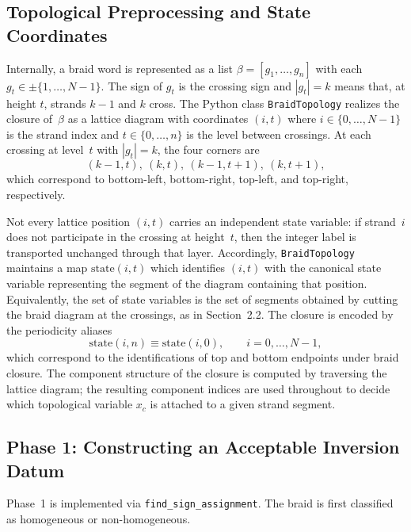 \documentclass[twocolumn]{article}
\begin{document}
\subsection{Topological Preprocessing and State Coordinates}

Internally, a braid word is represented as a list
\(\beta=[g_1,\dots,g_n]\) with each \(g_t\in\pm\{1,\dots,N-1\}\).
The sign of \(g_t\) is the crossing sign and \(|g_t|=k\) means that, at height
\(t\), strands \(k-1\) and \(k\) cross.
The Python class \texttt{BraidTopology} 
realizes the closure of~\(\beta\) as a lattice diagram with coordinates
\((i,t)\) where \(i\in\{0,\dots,N-1\}\) is the strand index and
\(t\in\{0,\dots,n\}\) is the level between crossings.
At each crossing at level~\(t\) with \(|g_t|=k\), the four corners are
\begin{equation}\label{eq:corner-coordinates}
  (k-1,t),\ (k,t),\ (k-1,t+1),\ (k,t+1),
\end{equation}
which correspond to bottom-left, bottom-right, top-left, and top-right,
respectively.

Not every lattice position \((i,t)\) carries an independent state variable:
if strand~\(i\) does not participate in the crossing at height~\(t\), then the
integer label is transported unchanged through that layer.
Accordingly, \texttt{BraidTopology} maintains a map
\(\mathrm{state}(i,t)\) which identifies \((i,t)\) with the canonical state
variable representing the segment of the diagram containing that position.
Equivalently, the set of state variables is the set of segments obtained by
cutting the braid diagram at the crossings, as in Section~2.2.
The closure is encoded by the periodicity aliases
\begin{equation}\label{eq:periodicity}
  \mathrm{state}(i,n)\equiv \mathrm{state}(i,0),\qquad i=0,\dots,N-1,
\end{equation}
which correspond to the identifications of top and bottom endpoints under braid
closure.
The component structure of the closure is computed by traversing the lattice
diagram; the resulting component indices are used throughout to decide which
topological variable \(x_c\) is attached to a given strand segment.

\subsection{Phase 1: Constructing an Acceptable Inversion Datum}

Phase~1 is implemented via
\texttt{find\_sign\_assignment}.
The braid is first classified as homogeneous or non-homogeneous.
\end{document}
